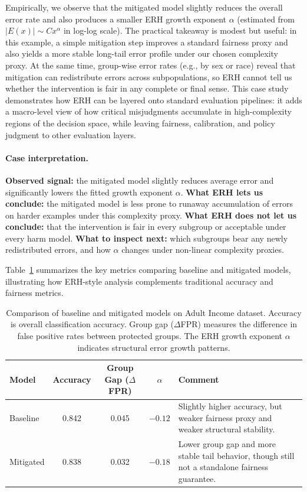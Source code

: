 \documentclass[12pt,a4paper]{article}
\theoremstyle{definition}
\theoremstyle{remark}
\begin{document}
Empirically, we observe that the mitigated model slightly reduces the overall error rate and also produces a smaller ERH growth exponent $\alpha$ (estimated from $|E(x)| \sim C x^\alpha$ in log-log scale). The practical takeaway is modest but useful: in this example, a simple mitigation step improves a standard fairness proxy and also yields a more stable long-tail error profile under our chosen complexity proxy.
At the same time, group-wise error rates (e.g., by sex or race) reveal that mitigation can redistribute errors across subpopulations, so ERH cannot tell us whether the intervention is fair in any complete or final sense.
This case study demonstrates how ERH can be layered onto standard evaluation pipelines: it adds a macro-level view of how critical misjudgments accumulate in high-complexity regions of the decision space, while leaving fairness, calibration, and policy judgment to other evaluation layers.

\paragraph{Case interpretation.}
\textbf{Observed signal:} the mitigated model slightly reduces average error and significantly lowers the fitted growth exponent $\alpha$.
\textbf{What ERH lets us conclude:} the mitigated model is less prone to runaway accumulation of errors on harder examples under this complexity proxy.
\textbf{What ERH does not let us conclude:} that the intervention is fair in every subgroup or acceptable under every harm model.
\textbf{What to inspect next:} which subgroups bear any newly redistributed errors, and how $\alpha$ changes under non-linear complexity proxies.

Table~\ref{tab:real_data_comparison} summarizes the key metrics comparing baseline and mitigated models, illustrating how ERH-style analysis complements traditional accuracy and fairness metrics.

\begin{table}[htbp]
\centering
\small
\caption{Comparison of baseline and mitigated models on Adult Income dataset. Accuracy is overall classification accuracy. Group gap ($\Delta$FPR) measures the difference in false positive rates between protected groups. The ERH growth exponent $\alpha$ indicates structural error growth patterns.}
\label{tab:real_data_comparison}
\begin{tabularx}{\textwidth}{l c c c >{\raggedright\arraybackslash}X}
\toprule
\textbf{Model} & \textbf{Accuracy} & \textbf{Group Gap ($\Delta$FPR)} & \textbf{$\alpha$} & \textbf{Comment} \\
\midrule
Baseline  & 0.842 & 0.045 & $-0.12$ & Slightly higher accuracy, but weaker fairness proxy and weaker structural stability. \\
Mitigated & 0.838 & 0.032 & $-0.18$ & Lower group gap and more stable tail behavior, though still not a standalone fairness guarantee. \\
\bottomrule
\end{tabularx}
\normalsize
\end{table}
\end{document}
